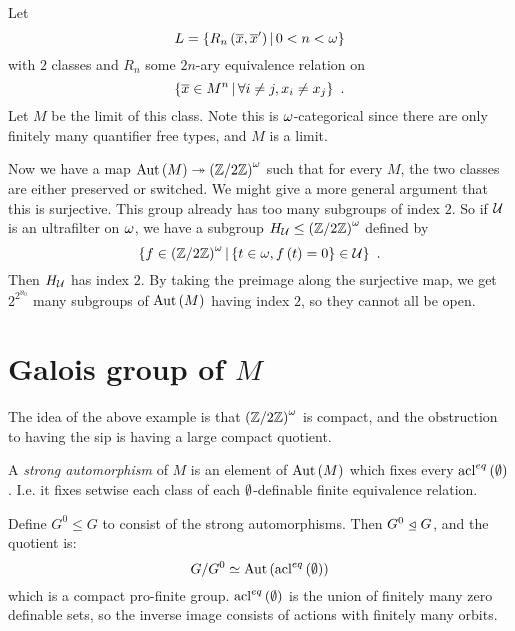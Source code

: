 \documentclass{amsart}
\begin{document}
\begin{exm}
Let 
\begin{equation}
L= \left\{ R_n\left( \overline{x} , \overline{x}'\right) \, \middle\vert \, 0 < n < \omega \right\}
\end{equation}
with $2$ classes and $R_n$ some $2n$-ary equivalence relation on
\begin{equation}
\left\{ \overline{x}\in M^n \, \middle\vert \,\forall i\neq j, x_i\neq x_j \right\} \ .
\end{equation}
Let $M$ be the \Fraisse limit of this class. Note this is $\omega$-categorical since there
are only finitely many quantifier free types, and $M$ is a \Fraisse limit. 

Now we have a map $\operatorname{Aut}\left( M \right)\twoheadrightarrow \left( \mathbb{Z} / 2 \mathbb{Z} \right)^\omega$ such that for
every $M$, the two classes are either preserved or switched. 
We might give a more general argument that this is surjective. 
This group already has too many subgroups of index $2$. So if $\mathcal{U}$ is an ultrafilter on
$\omega$, we have a subgroup $H_{\mathcal{U}}\leq \left( \mathbb{Z} / 2\mathbb{Z} \right)^\omega$ defined by
\begin{equation}
\left\{ f\in \left( \mathbb{Z} / 2\mathbb{Z} \right)^\omega \, \middle\vert \, \left\{ t\in \omega , f\left( t \right) = 0
\right\}\in \mathcal{U} \right\} \ .
\end{equation}
Then $H_{\mathcal{U}}$ has index $2$.
By taking the preimage along the surjective map, we get $2^{2^{\aleph_0}}$ many subgroups
of $\operatorname{Aut}\left( M\right)$ having index $2$, so they cannot all be open.
\label{exm:isp_counter}
\end{exm}

\section{Galois group of $M$}

The idea of the above example is that $\left( \mathbb{Z} / 2\mathbb{Z} \right)^\omega$ is compact, 
and the obstruction to having the sip is having a large compact quotient.

\begin{defn}
A \emph{strong automorphism} of $M$ is an element of $\operatorname{Aut}\left( M \right)$ which fixes
every $\operatorname{acl}^{eq}\left( \emptyset \right)$.
I.e. it fixes setwise each class
of each $\emptyset$-definable finite equivalence relation.
\end{defn}

Define $G^0\leq G$ to consist of the strong automorphisms. 
Then $G^0\ \underline{\triangleleft}\  G$, and the quotient is:
\begin{equation}
G / G^0 \simeq \operatorname{Aut}\left( \operatorname{acl}^{eq}\left( \emptyset \right) \right)
\end{equation}
which is a compact pro-finite group. 
$\operatorname{acl}^{eq}\left( \emptyset \right)$ is the union of finitely many zero definable sets, so the
inverse image consists of actions with finitely many orbits.
\end{document}
